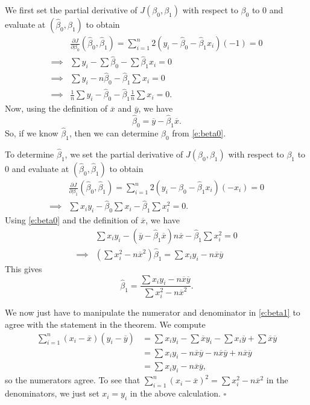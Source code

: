 \documentclass[letterpaper, 12pt]{amsart}
\begin{document}
We first set the partial derivative of $J(\beta_0, \beta_1)$ with respect to $\beta_0$ to 0 and evaluate at $( \hat{\beta}_0, \hat{\beta}_1 )$ to obtain 
\begin{align*}
& \frac{\partial J}{\partial \beta_0} (\hat{\beta}_0, \hat{\beta}_1) = \sum_{i=1}^n 2 ( y_i - \hat{\beta}_0 - \hat{\beta}_1 x_i ) (-1)  = 0 \\
\implies & \sum y_i - \sum \hat{\beta}_0 - \sum \hat{\beta}_1 x_i = 0 \\
\implies & \sum y_i - n \hat{\beta}_0 - \hat{\beta}_1 \sum  x_i = 0 \\
\implies & \frac{1}{n} \sum y_i - \hat{\beta}_0 - \hat{\beta}_1 \frac{1}{n} \sum  x_i = 0. 
\end{align*}
Now, using the definition of $\overline x$ and $\overline y$, we have
\begin{equation} \label{e:beta0}
\hat{\beta}_0  =  \overline{y}  - \hat{\beta}_1 \overline{x}. 
\end{equation}
So, if we know $\hat{\beta}_1$, then we can determine $\hat{\beta}_0$ from \eqref{e:beta0}. 


To determine $\hat{\beta}_1$, we set the partial derivative of $J(\beta_0, \beta_1)$ with respect to $\beta_1$ to 0 and evaluate at $( \hat{\beta}_0, \hat{\beta}_1 )$ to obtain 
\begin{align*}
& \frac{\partial J}{\partial \beta_1} (\hat{\beta}_0, \hat{\beta}_1) = \sum_{i=1}^n 2 ( y_i - \hat{\beta}_0 - \hat{\beta}_1 x_i ) (-x_i)  = 0 \\
\implies & \sum x_i y_i - \hat{\beta}_0 \sum x_i - \hat{\beta}_1 \sum  x_i^2 = 0. 
\end{align*}
Using \eqref{e:beta0} and the definition of $\overline x$, we have
\begin{align*}
&  \sum x_i y_i - (\overline{y}  - \hat{\beta}_1 \overline{x}) n \overline{x}  -   \hat{\beta}_1 \sum  x_i^2 = 0 \\
\implies &  \left( \sum  x_i^2 - n \overline{x}^2 \right) \hat{\beta}_1 =  \sum x_i y_i - n \overline{x} \overline{y} 
\end{align*}
This gives 
\begin{equation} \label{e:beta1}
\hat{\beta}_1 =  \frac{ \sum x_i y_i - n \overline{x} \overline{y}}{\sum  x_i^2 - n \overline{x}^2 }. 
\end{equation}

We now just have to manipulate the numerator and denominator in \eqref{e:beta1} to agree with the statement in the theorem. We compute
\begin{align*}
\sum_{i=1}^n (x_i - \overline{x})(y_i - \overline{y})
&= \sum x_i y_i - \sum \overline{x} y_i - \sum x_i \overline{y} +  \sum \overline{x} \overline{y}   \\
&= \sum x_i y_i - n  \overline{x} \overline{y} - n \overline{x} \overline{y} +  n \overline{x} \overline{y}   \\
&= \sum x_i y_i - n  \overline{x} \overline{y}, 
\end{align*}
so the numerators agree. 
To see that $\sum_{i=1}^n (x_i - \overline{x})^2 = \sum x_i^2  - n  \overline{x}^2 $ in the denominators, we just set $x_i = y_i$ in the above calculation.  $\square$
\end{document}
